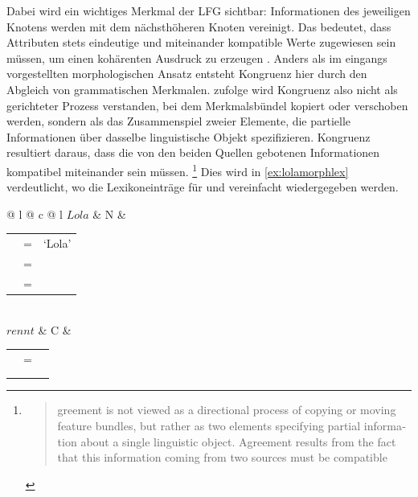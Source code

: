 Dabei wird ein wichtiges Merkmal der LFG sichtbar: Informationen des jeweiligen
Knotens werden mit dem nächsthöheren Knoten vereinigt. Das bedeutet, dass
Attributen stets eindeutige und miteinander kompatible Werte zugewiesen sein
müssen, um einen kohärenten Ausdruck zu erzeugen
\autocite[vgl.][43--54]{bresnanetal2016}. Anders als im eingangs vorgestellten
morphologischen Ansatz entsteht Kongruenz hier durch den Abgleich von
grammatischen Merkmalen. \citet[7]{wechslerzlatic2003} zufolge wird Kongruenz
also nicht als gerichteter Prozess verstanden, bei dem Merkmalsbündel kopiert
oder verschoben werden, sondern als das Zusammenspiel zweier Elemente, die
partielle Informationen über dasselbe linguistische Objekt spezifizieren.
Kongruenz resultiert daraus, dass die von den beiden Quellen gebotenen
Informationen kompatibel miteinander sein müssen.%
%
	\footnote{\foreignblockcquote{english}[7]{wechslerzlatic2003}{%
		greement is not viewed as a directional process of copying
		or moving feature bundles, but rather as two elements specifying
		partial information about a single linguistic object. Agreement results
		from the fact that this information coming from two sources must be
		compatible}.
	}
%
Dies wird in \cref{ex:lolamorphlex} verdeutlicht, wo die Lexikoneinträge für
 und  vereinfacht wiedergegeben werden.

\begin{exe}
\ex\label{ex:lolamorphlex}
	\begin{tabular}[t]{@{} l @{\hspace{2em}} c @{\hspace{2em}} l}
	$Lola$
		&	N
		&	\begin{tabular}[t]{l l l}
				\ups{\Pred}	& =	& `Lola' \\
				\ups{\Pers}	& =	& \Third \\
				\ups{\Num}	& =	& \Sg \\
			\end{tabular}
		\medskip \\

		$rennt$
		&	C
		&	\begin{tabular}[t]{l l l}
				\ups{\Pred}			& = 	& \astruct{rennen}{\ups{\Subj}} \\
				\ups{\Subj\ \Pers}	& \req	& \Third{} \\
				\ups{\Subj\ \Num}	& \req	& \Sg{} \\
			\end{tabular}
	\end{tabular}
\end{exe}

